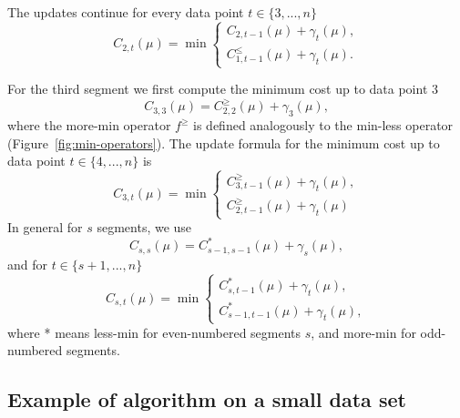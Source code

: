 \documentclass{article}
\begin{document}
The updates continue for every data point $t\in\{3, ..., n\}$
\begin{equation*}
  C_{2,t}(\mu) = \min
  \begin{cases}
    C_{2,t-1}(\mu) + \gamma_t(\mu),\\
    C_{1,t-1}^{\leq}(\mu) + \gamma_t(\mu).
  \end{cases}
\end{equation*}

For the third segment we first compute the minimum cost up to data point 3
\begin{equation*}
  C_{3,3}(\mu) = C_{2,2}^{\geq}(\mu) + \gamma_3(\mu),
\end{equation*}
where the more-min operator $f^\geq$ is defined analogously to the
min-less operator (Figure~\ref{fig:min-operators}). The update formula
for the minimum cost up to data point $t\in\{4, ..., n\}$ is
\begin{equation*}
  C_{3,t}(\mu) = \min
  \begin{cases}
    C_{3,t-1}^{\geq}(\mu)+\gamma_t(\mu),\\
    C_{2,t-1}^{\geq}(\mu)+\gamma_t(\mu)
  \end{cases}
\end{equation*}
In general for $s$ segments, we use
\begin{equation}
  C_{s,s}(\mu) = C_{s-1,s-1}^{*}(\mu) + \gamma_s(\mu),
\end{equation}
and for $t\in\{s+1, ..., n\}$
\begin{equation}
  C_{s,t}(\mu) = \min
  \begin{cases}
    C_{s,t-1}^{*}(\mu)+\gamma_t(\mu),\\
    C_{s-1,t-1}^{*}(\mu)+\gamma_t(\mu),
  \end{cases}
\end{equation}
where * means less-min for even-numbered segments $s$, and more-min
for odd-numbered segments.

\subsection{Example of algorithm on a small data set}
\end{document}

